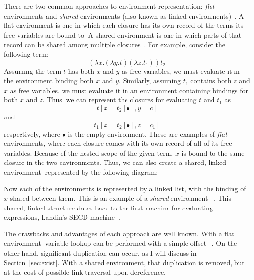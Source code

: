 There are two common approaches to environment representation: \emph{flat}
environments and \emph{shared} environments (also known as linked
environments)~\cite{appel1988optimizing,shao1994space}. A flat environment is
one in which each closure has its own record of the terms its free variables are
bound to. A shared environment is one in which parts of that record can be
shared among multiple closures~\cite{appel1988optimizing,shao1994space}. For
example, consider the following term: $$(\lambda x.(\lambda y.t) (\lambda
z.t_1)) t_2$$ Assuming the term $t$ has both $x$ and $y$ as free variables, we
must evaluate it in the environment binding both $x$ and $y$.  Similarly,
assuming $t_1$ contains both $z$ and $x$ as free variables, we must evaluate it
in an environment containing bindings for both $x$ and $z$. Thus, we can
represent the closures for evaluating $t$ and $t_1$  as $$t[x=t_2[\bullet],
y=c]$$ and $$t_1[x=t_2[\bullet], z=c_1]$$ respectively, where $\bullet$ is the
empty environment.  These are examples of \emph{flat} environments, where each
closure comes with its own record of all of its free variables. Because of the
nested scope of the given term, $x$ is bound to the same closure in the two
environments. Thus, we can also create a shared, linked environment,
represented by the following diagram:

\begin{center}
\end{center}
Now each of the environments is represented by a linked list, with the binding
of $x$ shared between them. This is an example of a \emph{shared} environment
~\cite{appel1988optimizing}. This shared, linked structure dates back to the 
first machine for evaluating expressions, Landin's SECD
machine~\cite{landin1964mechanical}.

The drawbacks and advantages of each approach are well known. With a flat
environment, variable lookup can be performed with a simple offset
~\cite{jonesstg,appel1992compiling}. On the other hand, significant
duplication can occur, as I will discuss in Section~\ref{sec:exist}.
With a shared environment, that duplication is removed, but at the cost of
possible link traversal upon dereference. 

